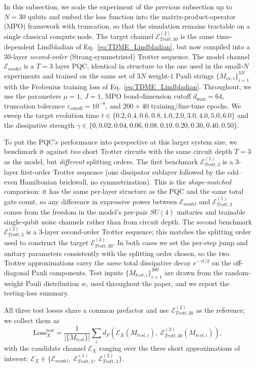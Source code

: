 \documentclass[%
 reprint,
superscriptaddress,
 amsmath,amssymb,
 aps,
]{revtex4-2}
\newcommand{\E}{\mathcal{E}}
\begin{document}
In this subsection, we scale the experiment of the previous subsection up to $N=30$ qubits and embed the loss function into the matrix-product-operator (MPO) framework with truncation, so that the simulation remains tractable on a single classical compute node. The target channel $\E_{Trott,30}^{(2)}$ is the same time-dependent Lindbladian of Eq.~\ref{eq:TDME_Lindbladian}, but now compiled into a $30$-layer \emph{second-order} (Strang-symmetrized) Trotter sequence. The model channel $\E_{model}$ is a $T=3$ layer PQC, identical in structure to the one used in the small-$N$ experiments and trained on the same set of $3N$ weight-$1$ Pauli strings $\{M_{in,i}\}_{i=1}^{3N}$ with the Frobenius training loss of Eq.~\ref{eq:TDME_Lindbladian}. Throughout, we use the parameters $\mu=1$, $J=1$, MPO bond-dimension cutoff $d_{\max}=64$, truncation tolerance $\varepsilon_{\text{cutoff}}=10^{-8}$, and $200+40$ training/fine-tune epochs. We sweep the target evolution time $t\in\{0.2,0.4,0.6,0.8,1.0,2.0,3.0,4.0,5.0,6.0\}$ and the dissipative strength $\gamma\in\{0,0.02,0.04,0.06,0.08,0.10,0.20,0.30,0.40,0.50\}$.

To put the PQC's performance into perspective at this larger system size, we benchmark it against \emph{two} short Trotter circuits with the same circuit depth $T=3$ as the model, but \emph{different} splitting orders. The first benchmark $\E_{Trott,3}^{(1)}$ is a $3$-layer first-order Trotter sequence (one dissipator sublayer followed by the odd--even Hamiltonian brickwall, no symmetrization). This is the \emph{shape-matched} comparison: it has the same per-layer structure as the PQC and the same total gate count, so any difference in expressive power between $\E_{model}$ and $\E_{Trott,3}^{(1)}$ comes from the freedom in the model's per-pair $SU(4)$ unitaries and trainable single-qubit noise channels rather than from circuit depth. The second benchmark $\E_{Trott,3}^{(2)}$ is a $3$-layer second-order Trotter sequence; this matches the splitting order used to construct the target $\E_{Trott,30}^{(2)}$. In both cases we set the per-step jump and unitary parameters consistently with the splitting order chosen, so the two Trotter approximations carry the \emph{same} total dissipative decay $e^{-\gamma t/2}$ on the off-diagonal Pauli components. Test inputs $\{M_{test,i}\}_{i=1}^{300}$ are drawn from the random-weight Pauli distribution $w$, used throughout the paper, and we report the testing-loss summary.

All three test losses share a common prefactor and use $\E_{Trott,30}^{(2)}$ as the reference; we collect them as
\begin{equation}
    \text{Loss}_X^{\text{test}}
    = \frac{1}{|\{M_{test}\}|}\sum_{i} d_F\!\left(\E_X(M_{test,i}),\; \E_{Trott,30}^{(2)}(M_{test,i})\right),
\label{eq:TDME_test_losses_large_N}
\end{equation}
with the candidate channel $\E_X$ ranging over the three short approximations of interest:
$\E_X\in\{\E_{model},\; \E_{Trott,3}^{(1)},\; \E_{Trott,3}^{(2)}\}$.
\end{document}
